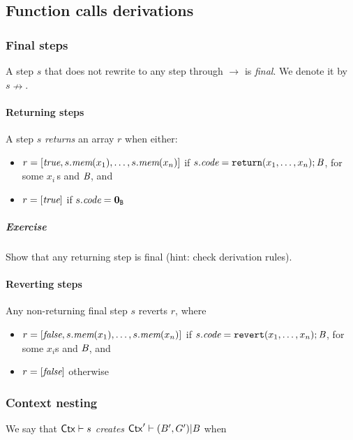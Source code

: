 \subsection{Function calls derivations}
\subsubsection{Final steps}
A step $s$ that does not rewrite to any step through $\rightarrow$ is \emph{final}. We denote it by $s \nrightarrow$. 
\paragraph{Returning steps}

A step $s$ \emph{returns} an array $r$ when either:
\begin{itemize}
    \item $r = [\textit{true},s.\textit{mem}(x_1),\dots,s.\textit{mem}(x_n)]$ if $s.\textit{code} = \mathtt{return}(x_1,\dots,x_n);\textit{B}$, for some $x_i$\,s and $\textit{B}$, and
    \item $r = [\textit{true}]$ if $s.\textit{code} = \mathbf{0}_{\texttt{B}}$
\end{itemize}
\subparagraph{Exercise} Show that any returning step is final (hint: check derivation rules).
 


\paragraph{Reverting steps}
Any non-returning final step $s$ reverts $r$, where
\begin{itemize}
    \item $r = \left[{\textit{false}, s.\textit{mem}(x_1),\dots, s.\textit{mem}(x_n)}\right]$ if $s.\textit{code} = \mathtt{revert}(x_1,\dots,x_n);\textit{B}$, for some $x_i$s and $\textit{B}$, and
    \item $r = \left[{\textit{false}}\right]$ otherwise
\end{itemize}

\subsubsection{Context nesting}

We say that \emph{$\mathsf{Ctx}\vdash s$ creates $\mathsf{Ctx}'\vdash(B',G')| B$} when


